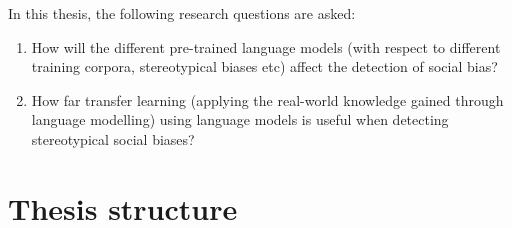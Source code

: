 In this thesis, the following research questions are asked:
\begin{enumerate}
    \item How will the different pre-trained language models (with respect to different training corpora, stereotypical biases etc) affect the detection of social bias?
    \item How far transfer learning (applying the real-world knowledge gained through language modelling) using language models is useful when detecting stereotypical social biases?
\end{enumerate}

\section{Thesis structure}

